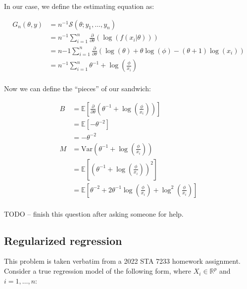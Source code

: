 \documentclass{report}
\begin{document}
In our case, we define the estimating equation as:

\begin{equation}\label{eq:ex-ols-pareto-estimating-equation}
    \begin{aligned}
        G_n(\theta, y) 
          &= n^{-1} \mathcal{S}(\theta; y_1, \dots, y_n) \\
          &= n^{-1} \sum_{i=1}^n \frac{\partial}{\partial\theta} \left(\log(f(x_i | \theta))\right) \\
          &= n{-1} \sum_{i=1}^n \frac{\partial}{\partial\theta} \left(\log(\theta) + \theta\log(\phi) - (\theta + 1)\log(x_i)\right) \\
          &= n^{-1} \sum_{i=1}^n \theta^{-1} + \log\left(\frac{\phi}{x_i}\right) \\
    \end{aligned}
\end{equation}

Now we can define the ``pieces'' of our sandwich:

\begin{equation}\label{eq:ex-ols-pareto-sandwich-pieces}
    \begin{aligned}
        B 
          &= \mathbb{E}\left[\frac{\partial}{\partial\theta} \left(\theta^{-1} + \log\left(\frac{\phi}{x_i}\right)\right)\right] \\
          &= \mathbb{E}\left[-\theta^{-2}\right] \\
          &= -\theta^{-2} \\
        M 
          &= \text{Var}\left(\theta^{-1} + \log\left(\frac{\phi}{x_i}\right)\right) \\
          &= \mathbb{E}\left[\left(\theta^{-1} + \log\left(\frac{\phi}{x_i}\right)\right)^2\right] \\
          &= \mathbb{E}\left[\theta^{-2} + 2\theta^{-1}\log\left(\frac{\phi}{x_i}\right) + \log^2\left(\frac{\phi}{x_i}\right)\right] \\
    \end{aligned}
\end{equation}

TODO -- finish this question after asking someone for help.

\subsection{Regularized regression}

This problem is taken verbatim from a 2022 STA 7233 homework assignment. Consider a true regression model of the following form, where $X_i \in \mathbb{R}^p$ and $i = 1, \dots, n$:
\end{document}
